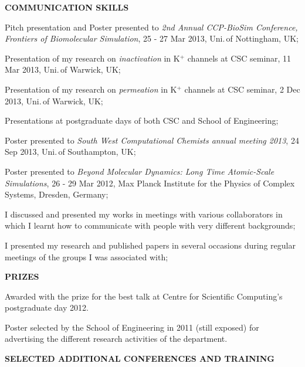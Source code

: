 \documentclass[a4paper,10pt,final]{memoir}
\newcommand{\Sep}{\vspace{1em}}
\newcommand{\SmallSep}{\vspace{0.4em}}
\newcommand{\CVSection}[1]
	{\Large\textbf{#1}\par
	\SmallSep\normalsize\normalfont}
\begin{document}
\Sep
\CVSection{COMMUNICATION SKILLS}
\begin{compactitem}[\color{RoyalBlue}$\circ$]
\item Pitch presentation and Poster presented to \textit{2nd Annual CCP-BioSim Conference, Frontiers of
    Biomolecular Simulation}, 25 - 27 Mar 2013, Uni.\,of Nottingham, UK;
\item Presentation of my research on \emph{inactivation} in K$^+$ channels at
  CSC seminar, 11 Mar 2013, Uni.\,of Warwick, UK;
\item Presentation of my research on \emph{permeation} in K$^+$  channels at CSC
  seminar, 2 Dec 2013, Uni.\,of Warwick, UK;
\item Presentations at postgraduate days of both CSC and School of Engineering;
\item Poster presented to \textit{South West Computational Chemists annual
    meeting 2013}, 24 Sep 2013, Uni.\,of Southampton, UK;
\item Poster presented to \textit{Beyond Molecular Dynamics: Long Time Atomic-Scale Simulations}, 26 - 29 Mar 2012,
  Max Planck Institute for the Physics of Complex Systems, Dresden, Germany;
\item I discussed and presented my works in meetings with various collaborators in which I
  learnt how to communicate with people with very different backgrounds;
\item I presented my research and published papers in several occasions during regular
  meetings of the groups I was associated with;
\end{compactitem}

\Sep
\CVSection{PRIZES} 
\begin{compactitem}[\color{RoyalBlue}$\circ$]
\item Awarded with the prize for the best talk at Centre for Scientific Computing's postgraduate day 2012.
\item Poster selected by the School of Engineering in 2011 (still exposed) for advertising the
  different research activities of the department.
\end{compactitem}


\Sep
\CVSection{SELECTED ADDITIONAL CONFERENCES AND TRAINING} 
\end{document}

